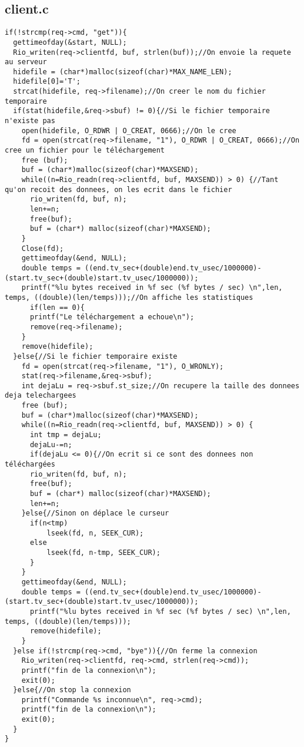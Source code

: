 \documentclass{report}
\begin{document}
            \subsection{client.c}
            \begin{lstlisting}
if(!strcmp(req->cmd, "get")){
  gettimeofday(&start, NULL);
  Rio_writen(req->clientfd, buf, strlen(buf));//On envoie la requete au serveur
  hidefile = (char*)malloc(sizeof(char)*MAX_NAME_LEN);
  hidefile[0]='T';
  strcat(hidefile, req->filename);//On creer le nom du fichier temporaire
  if(stat(hidefile,&req->sbuf) != 0){//Si le fichier temporaire n'existe pas
    open(hidefile, O_RDWR | O_CREAT, 0666);//On le cree
    fd = open(strcat(req->filename, "1"), O_RDWR | O_CREAT, 0666);//On cree un fichier pour le téléchargement
    free (buf);
    buf = (char*)malloc(sizeof(char)*MAXSEND);
    while((n=Rio_readn(req->clientfd, buf, MAXSEND)) > 0) {//Tant qu'on recoit des donnees, on les ecrit dans le fichier
      rio_writen(fd, buf, n);
      len+=n;
      free(buf);
      buf = (char*) malloc(sizeof(char)*MAXSEND);
    }
    Close(fd);
    gettimeofday(&end, NULL);
    double temps = ((end.tv_sec+(double)end.tv_usec/1000000)-(start.tv_sec+(double)start.tv_usec/1000000));
    printf("%lu bytes received in %f sec (%f bytes / sec) \n",len, temps, ((double)(len/temps)));//On affiche les statistiques
      if(len == 0){
      printf("Le téléchargement a echoue\n");
      remove(req->filename);
    }
    remove(hidefile);
  }else{//Si le fichier temporaire existe
    fd = open(strcat(req->filename, "1"), O_WRONLY);
    stat(req->filename,&req->sbuf);
    int dejaLu = req->sbuf.st_size;//On recupere la taille des donnees deja telechargees
    free (buf);
    buf = (char*)malloc(sizeof(char)*MAXSEND);
    while((n=Rio_readn(req->clientfd, buf, MAXSEND)) > 0) {
      int tmp = dejaLu;
      dejaLu-=n;
      if(dejaLu <= 0){//On ecrit si ce sont des donnees non téléchargées
      rio_writen(fd, buf, n);
      free(buf);
      buf = (char*) malloc(sizeof(char)*MAXSEND);
      len+=n;
    }else{//Sinon on déplace le curseur
      if(n<tmp)
          lseek(fd, n, SEEK_CUR);
      else
          lseek(fd, n-tmp, SEEK_CUR);
      }
    }
    gettimeofday(&end, NULL);
    double temps = ((end.tv_sec+(double)end.tv_usec/1000000)-(start.tv_sec+(double)start.tv_usec/1000000));
      printf("%lu bytes received in %f sec (%f bytes / sec) \n",len, temps, ((double)(len/temps)));
      remove(hidefile);
    }
  }else if(!strcmp(req->cmd, "bye")){//On ferme la connexion
    Rio_writen(req->clientfd, req->cmd, strlen(req->cmd));
    printf("fin de la connexion\n");
    exit(0);
  }else{//On stop la connexion
    printf("Commande %s inconnue\n", req->cmd);
    printf("fin de la connexion\n");
    exit(0);
  }
}
            \end{lstlisting}
\end{document}
